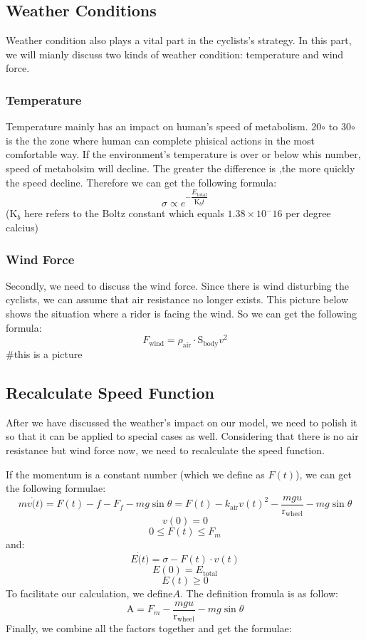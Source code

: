 \documentclass{article}
\begin{document}


		\subsection{Weather Conditions}
			Weather condition also plays a vital part in the cyclists's strategy. In this part, we will mianly discuss two kinds of weather condition: temperature and wind force.
		\subsubsection{Temperature}
			Temperature mainly has an impact on human's speed of metabolism. 20$\circ$ to 30$\circ$ is the the zone where human can complete phisical actions in the most comfortable way. If the environment's temperature is over or below whis number, speed of metabolsim will decline. The greater the difference is ,the more quickly the speed decline. Therefore we can get the following formula:
			$$\sigma\propto e^{-\dfrac{ E _\mathrm{total}}{\mathrm{K}_ b t}}$$
			($\mathrm{K}_ b $ here refers to the Boltz constant which equals $1.38\times10^-16$ per degree calcius)
			\subsubsection{Wind Force}
			Secondly, we need to discuss the wind force. Since there is wind disturbing the cyclists, we can assume that air resistance no longer exists. This picture below shows the situation where a rider is facing the wind. So we can get the following formula:
			$$F_\mathrm{wind}=\rho_\mathrm{air}\cdot\mathrm{S}_\mathrm{body}v^2$$
			\#this is a picture



		\subsection{Recalculate Speed Function}
		After we have discussed the weather's impact on our model, we need to polish it so that it can be applied to special cases as well. Considering that there is no air resistance but wind force now, we need to recalculate the speed function.

		If the momentum is a constant number (which we define as $F(t)$), we can get the following formulae:
		$$mv\dot(t)=F(t)-f-F_{f}-mg\sin \theta=F(t)- k _\mathrm{air}{v(t)}^2-\dfrac{mgu}{\mathrm{r}_\mathrm{wheel}}-mg\sin \theta$$
		$$v(0)=0$$
		$$0\leq F(t)\leq F_{m}$$
		and:
		$$ E \dot(t)=\sigma-F(t)\cdot v(t)$$
		$$ E (0)= E _\mathrm{total}$$
		$$ E (t)\geq0$$
		To facilitate our calculation, we define$A$. The definition fromula is as follow:
		$$\mathrm{A}=F_m-\dfrac{mgu}{\mathrm{r}_\mathrm{wheel}}-mg\sin \theta$$
		Finally, we combine all the factors together and get the formulae:
\end{document}
